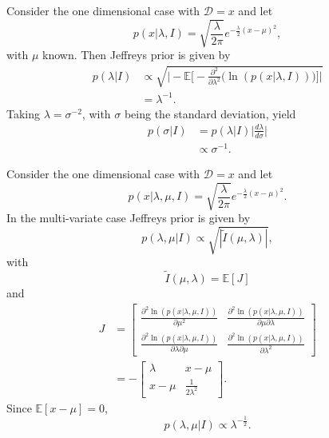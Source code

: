 \begin{example}
	Consider the one dimensional case with $\mathcal{D}=x$ and let 
	\begin{equation}
		p(x|\lambda,I)=\sqrt{\frac{\lambda}{2\pi}} e^{-\frac{\lambda}{2}(x-\mu)^2},
	\end{equation}
	with $\mu$ known. Then Jeffreys prior is given by
	\begin{equation}
		\begin{split}
			p(\lambda|I)&\propto \sqrt{\bigg|-\mathbb{E}\bigg[-\frac{\partial^2}{\partial \lambda^2}\bigg(\ln(p(x|\lambda,I))\bigg)\bigg]\bigg|}\\
			&=\lambda^{-1}.
		\end{split}
	\end{equation}
	Taking $\lambda=\sigma^{-2}$, with $\sigma$ being the standard deviation, yield
	\begin{equation}
		\begin{split}
			p(\sigma|I)&=p(\lambda|I)\bigg|\frac{d\lambda}{d\sigma}\bigg|\\
			&\propto \sigma^{-1}.
		\end{split}
	\end{equation}	
\end{example}
\begin{example}
	Consider the one dimensional case with $\mathcal{D}=x$ and let 
	\begin{equation}
		p(x|\lambda,\mu,I)=\sqrt{\frac{\lambda}{2\pi}} e^{-\frac{\lambda}{2}(x-\mu)^2}.
	\end{equation}
	In the multi-variate case Jeffreys prior is given by
	\begin{equation}
		p(\lambda,\mu|I)\propto\sqrt{|\tilde{I}(\mu,\lambda)|},
	\end{equation}
	with 
	\begin{equation}
		\tilde{I}(\mu,\lambda)=\mathbb{E}[J]
	\end{equation}
	and
	\begin{equation}
		\begin{split}
			J&=\begin{bmatrix}
				\frac{\partial^2 \ln(p(x|\lambda,\mu,I))}{\partial \mu^2} & \frac{\partial^2 \ln(p(x|\lambda,\mu,I))}{\partial \mu \partial \lambda}\\
				\frac{\partial^2 \ln(p(x|\lambda,\mu,I))}{\partial \lambda \partial \mu} & \frac{\partial^2 \ln(p(x|\lambda,\mu,I))}{ \partial \lambda^2}
			\end{bmatrix}\\
			&=-\begin{bmatrix}
				\lambda & x-\mu\\
				x-\mu & \frac{1}{2\lambda^2}
			\end{bmatrix}.
		\end{split}
	\end{equation}
	Since $\mathbb{E}[x-\mu]=0$,
	\begin{equation}
		p(\lambda,\mu|I)\propto\lambda^{-\frac{1}{2}}.
	\end{equation}	
\end{example}
